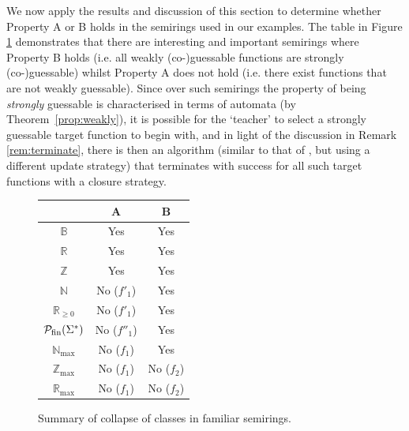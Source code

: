 \documentclass[10pt,a4paper]{amsart}
\theoremstyle{definition}
\numberwithin{equation}{section}
\numberwithin{theorem}{section}
\begin{document}
We now apply the results and discussion of this section to determine whether Property A or B holds in the semirings used in our examples. The table in Figure \ref{fig:table} demonstrates that there are interesting and important semirings where Property B holds (i.e. all weakly (co-)guessable functions are strongly (co-)guessable) whilst Property A does not hold (i.e. there exist functions that are not weakly guessable). Since over such semirings the property of being \emph{strongly} guessable is  characterised in terms of automata (by Theorem~\ref{prop:weakly}), it is possible for the `teacher' to select a strongly guessable target function to begin with, and in light of the discussion in Remark \ref{rem:terminate}, there is then an algorithm (similar to that of \cite{HKRS20}, but using a different update strategy) that terminates with success for all such target functions with a closure strategy.

\begin{figure}[ht]
	\begin{minipage}{6.5cm}
		\begin{tabular}{c|cc}
			\multicolumn{1}{c}{} & A & B  \\ \toprule
			$\mathbb{B}$ & Yes&  Yes \\ %
			$\mathbb{R}$ & Yes &  Yes  \\ %
			$\mathbb{Z}$ & Yes&  Yes \\ %
			$\mathbb{N}$ & No ($f'_1$) &  Yes   \\ %
			$\mathbb{R}_{\geq 0}$ & No ($f'_1$) &  Yes  \\ %
			$\mathcal{P}_{\rm fin}(\Sigma^*)$ & No ($f''_1$) &  Yes   \\ %
			$\mathbb{N}_{\max}$ & No ($f_1$) & Yes   \\ %
			$\mathbb{Z}_{\max}$ & No ($f_1$) &  No ($f_2$)   \\ %
			$\mathbb{R}_{\max}$ & No ($f_1$)  &  No ($f_2$)  \\
			
		\end{tabular}
	\end{minipage}
	\caption{Summary of collapse of classes in familiar semirings.}
	\label{fig:table}
\end{figure}
\end{document}
